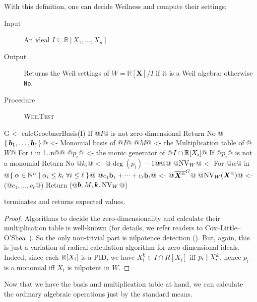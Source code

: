 \documentclass[runningheads]{llncs}
\begin{document}
With this definition, one can decide Weilness and compute their settings:

\begin{algorithm}\label{alg:weil-test}
  \hspace{1em}\vspace{-.25em}
  \begin{description}
    \item[Input] An ideal $I \subseteq \mathbb{R}[X_1, \dots, X_n]$
    \item[Output] Returns the Weil settings of $W = \mathbb{R}[\boldsymbol{X}]/I$ if it is a Weil algebra; otherwise \verb|No|.
    \item[Procedure] \textup{\textsc{WeilTest}}
  \end{description}

  \begin{alg}
G <- calcGroebnerBasis(I)
If @$I$@ is not zero-dimensional
  Return No
@$\set{\boldsymbol{b}_1, \dots, \boldsymbol{b}_\ell}$@ <- Monomial basis of @$I$@
@$M$@ <- the Multiplication table of @$W$@
For i in 1..n@\label{line:weil-test:radical-start}@
  @$p_i$@ <- the monic generator of @$I \cap \mathbb{R}[X_i]$@
  If @$p_i$@ is not a monomial
    Return No
  @$k_i$@ <- @$\deg(p_i) - 1$@@\label{line:weil-test:radical-end}@
@$\operatorname{NV}_W$@ <- {}
For @$\alpha$@ in @$\Set{\alpha \in \mathbb{N}^n | \alpha_i \leq k_i \; \forall i \leq \ell}$@
  @$c_1 \boldsymbol{b}_1 + \cdots + c_\ell \boldsymbol{b}_\ell$@ <- @${\overline{\boldsymbol{X}^\alpha}}^{G}$@
  @$\operatorname{NV}_W(\boldsymbol{X}^\alpha)$@ <- (@$c_1, \dots, c_\ell$@)
Return (@$\vec{\boldsymbol{b}}, M, \vec{k}, \NonVan_W$@)
\end{alg}
\end{algorithm}

\begin{theorem}
   terminates and returns expected values.
\end{theorem}
\begin{proof}
  Algorithms to decide the zero-dimensionality and calculate their multiplication table is well-known (for details, we refer readers to Cox--Little--O'Shea~\cite[Chapter 2]{CLO:2005}).
  So the only non-trivial part is nilpotence detection ().
  But, again, this is just a variation of radical calculation algorithm for zero-dimensional ideals.
  Indeed, since each $\mathbb{R}[X_i]$ is a PID, we have $X_i^k \in I \cap R[X_i]$ iff $p_i \mathrel{\mid} X_i^k$, hence $p_i$ is a monomial iff $X_i$ is nilpotent in $W$.
\end{proof}
Now that we have the basis and multiplication table at hand, we can calculate the ordinary algebraic operations just by the standard means.
\end{document}
